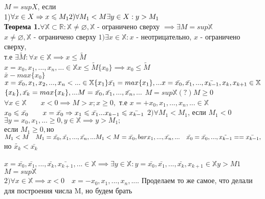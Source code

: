 \documentclass[../main.tex]{subfiles}
\begin{document}
$M=supX$, если\\
1)$\forall x\in X \implies x\leqslant M_1\\
2)\forall M_1< M\exists y\in X: y> M_1$\\
\textbf{Теорема 1.}$\forall\mathbb{X} \subset\mathbb{R}:\mathbb{X}\neq\varnothing , \mathbb{X}$ - ограничено сверху $\implies \exists M=sup\mathbb{X}$\\
$ x\neq\varnothing,\mathbb{X}$ - ограничено сверху $1) \exists x\in\mathbb{X} : x$  - неотрицательно, $x$ - ограничено сверху,
\\т.е $\exists\tilde{M} :\forall x\in\mathbb{X}\implies x\leqslant\tilde{M}$\\
$x=x_0,x_1,...,x_n,... \in \mathbb{X} x\leqslant\tilde{M} \{x_0\} \implies x_0\leqslant\tilde{M}$\\
$\bar{x} - max\{x_0\}$\\
$x=\bar{x_0},x_1,x_2,...,x_n<... \in\mathbb{X} \{x_1\}  \bar{x_1}=max\{x_1\},...\\
x=\bar{x_0},\bar{x_1},...,\bar{x_{k-1}},x_k,x_{k+1} \in\mathbb{X}\\$
$\{x_k\},\bar{x_k}=max\{x_k\},...  M=\bar{x_0},\bar{x_1},...,\bar{x_n},...\\$
$M=sup\mathbb{X}(?) M\geqslant 0$\\
$\forall x\in\mathbb{X}  \qquad x<0 \implies M>x ; x\geqslant 0,$ т.е $x=+x_0,x_1,...,x_n,... \in\mathbb{X}$\\
$x_0\leqslant\bar{x_0}\qquad x=\bar{x_0} \implies x_1\leqslant\bar{x_1}...x_{k-1}\leqslant\bar{x_{k-1}}\\$
$2)\forall M_1<M_1$, если $M_1<0$ $\exists y=x_0,x_1,...\geqslant 0 , y\in\mathbb{X}\implies y>M_1;$\\
если $M_1\geqslant 0,$но $M_1<M\quad M_1=\tilde{x_0},\tilde{x_1},...,\tilde{x_n},...\\
M_1<M=\bar{x_0},bar{x_1},...,\bar{x_n},...\quad \tilde{x_0}=\bar{x_0},...,\tilde{x_{k-1}}==\bar{x_{k-1}},$но $\tilde{x_k}<\bar{x_k}$\\
\\
$x=\bar{x_0},\bar{x_1},...,\bar{x_k},\bar{x_{k+1}},...\in\mathbb{X}\implies\exists y\in\mathbb{X} : y=\bar{x_0},\bar{x_1},...,\bar{x_k},x_{k+1}\in\mathbb{X} y>M1$\\
$M=sup\mathbb{X}$\\
$2)\forall x\in\mathbb{X}\implies x<0 \quad x=-x_0,x_1,...,x_n,...$. Проделаем то же самое, что делали для построения числа M, но будем брать 
\end{document}
